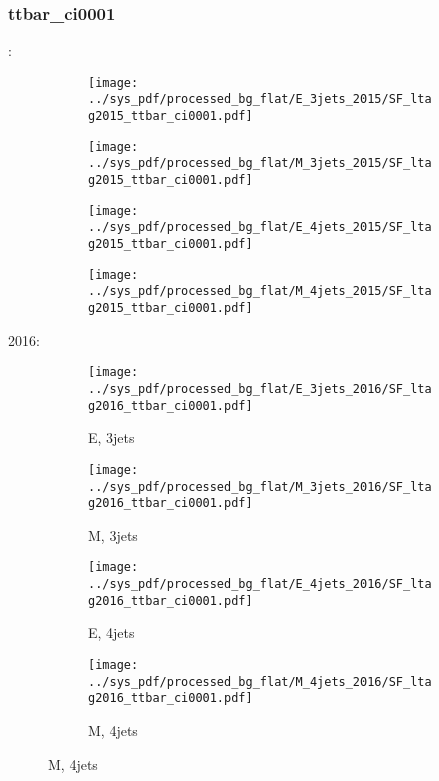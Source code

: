 \documentclass{beamer}
\begin{document}
\begin{frame}
\frametitle{ttbar_ci0001}
\fontsize{5}{1}:
\begin{figure}
\centering
\begin{subfigure}[b]{0.24\textwidth}
\texttt{[image: ../sys\_pdf/processed\_bg\_flat/E\_3jets\_2015/SF\_ltag2015\_ttbar\_ci0001.pdf]}
\end{subfigure}
\begin{subfigure}[b]{0.24\textwidth}
\texttt{[image: ../sys\_pdf/processed\_bg\_flat/M\_3jets\_2015/SF\_ltag2015\_ttbar\_ci0001.pdf]}
\end{subfigure}
\begin{subfigure}[b]{0.24\textwidth}
\texttt{[image: ../sys\_pdf/processed\_bg\_flat/E\_4jets\_2015/SF\_ltag2015\_ttbar\_ci0001.pdf]}
\end{subfigure}
\begin{subfigure}[b]{0.24\textwidth}
\texttt{[image: ../sys\_pdf/processed\_bg\_flat/M\_4jets\_2015/SF\_ltag2015\_ttbar\_ci0001.pdf]}
\end{subfigure}
\end{figure}
2016:
\begin{figure}
\centering
\begin{subfigure}[b]{0.24\textwidth}
\texttt{[image: ../sys\_pdf/processed\_bg\_flat/E\_3jets\_2016/SF\_ltag2016\_ttbar\_ci0001.pdf]}
\captionsetup{font=tiny}
\caption{E, 3jets}
\end{subfigure}
\begin{subfigure}[b]{0.24\textwidth}
\texttt{[image: ../sys\_pdf/processed\_bg\_flat/M\_3jets\_2016/SF\_ltag2016\_ttbar\_ci0001.pdf]}
\captionsetup{font=tiny}
\caption{M, 3jets}
\end{subfigure}
\begin{subfigure}[b]{0.24\textwidth}
\texttt{[image: ../sys\_pdf/processed\_bg\_flat/E\_4jets\_2016/SF\_ltag2016\_ttbar\_ci0001.pdf]}
\captionsetup{font=tiny}
\caption{E, 4jets}
\end{subfigure}
\begin{subfigure}[b]{0.24\textwidth}
\texttt{[image: ../sys\_pdf/processed\_bg\_flat/M\_4jets\_2016/SF\_ltag2016\_ttbar\_ci0001.pdf]}
\captionsetup{font=tiny}
\caption{M, 4jets}
\end{subfigure}
\end{figure}
\end{frame}
\end{document}
